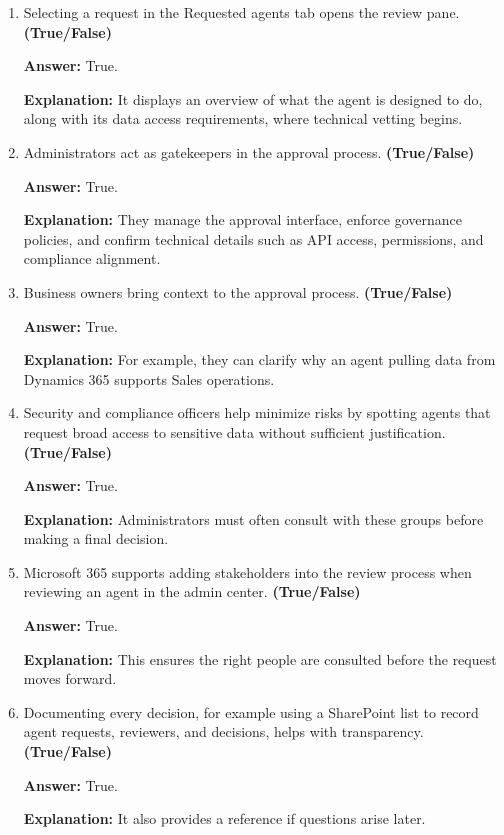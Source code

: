 \documentclass[10pt]{article}
\begin{document}
\begin{enumerate}[leftmargin=*]
\item Selecting a request in the Requested agents tab opens the review pane. \textbf{(True/False)}

\textbf{Answer:} True.

\textbf{Explanation:} It displays an overview of what the agent is designed to do, along with its data access requirements, where technical vetting begins.

\item Administrators act as gatekeepers in the approval process. \textbf{(True/False)}

\textbf{Answer:} True.

\textbf{Explanation:} They manage the approval interface, enforce governance policies, and confirm technical details such as API access, permissions, and compliance alignment.

\item Business owners bring context to the approval process. \textbf{(True/False)}

\textbf{Answer:} True.

\textbf{Explanation:} For example, they can clarify why an agent pulling data from Dynamics 365 supports Sales operations.

\item Security and compliance officers help minimize risks by spotting agents that request broad access to sensitive data without sufficient justification. \textbf{(True/False)}

\textbf{Answer:} True.

\textbf{Explanation:} Administrators must often consult with these groups before making a final decision.

\item Microsoft 365 supports adding stakeholders into the review process when reviewing an agent in the admin center. \textbf{(True/False)}

\textbf{Answer:} True.

\textbf{Explanation:} This ensures the right people are consulted before the request moves forward.

\item Documenting every decision, for example using a SharePoint list to record agent requests, reviewers, and decisions, helps with transparency. \textbf{(True/False)}

\textbf{Answer:} True.

\textbf{Explanation:} It also provides a reference if questions arise later.


\end{enumerate}
\end{document}
